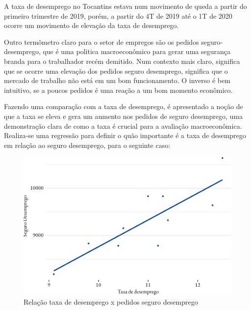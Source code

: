 \begin{figure}[!h]
\begin{subfigure}{\linewidth}
	\end{subfigure}
\end{figure}

\par A taxa de desemprego no Tocantins estava num movimento de queda a partir do primeiro trimestre de 2019, porém, a partir do 4T de 2019 até o 1T de 2020 ocorre um movimento de elevação da taxa de desemprego.



\par Outro termômetro claro para o setor de empregos são os pedidos seguro-desemprego, que é uma politica macroeconômico para gerar uma segurança branda para o trabalhador recém demitido. Num contexto mais claro, significa que se ocorre uma elevação dos pedidos seguro desemprego, significa que o mercado de trabalho não está em um bom funcionamento. O inverso é bem intuitivo, se a poucos pedidos é uma reação a um bom momento econômico. 

\par Fazendo uma comparação com a taxa de desemprego, é apresentado a noção de que a taxa se eleva e gera um aumento nos pedidos de seguro desemprego, uma demonstração clara de como a taxa é crucial para a avaliação macroeconômica. Realiza-se uma regressão para definir o quão importante é a taxa de desemprego em relação ao seguro desemprego, para o seguinte caso:

\begin{figure}[h]
	\caption{Relação taxa de desemprego x pedidos seguro desemprego}
	\includegraphics[width=\linewidth]{fig/reg_emprego-2.pdf}
\end{figure}

